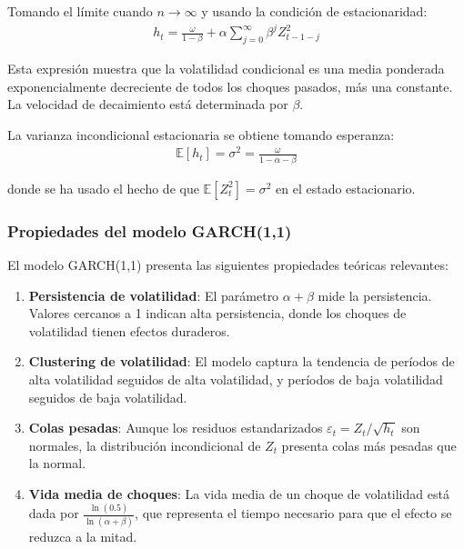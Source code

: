 Tomando el límite cuando $n \to \infty$ y usando la condición de estacionaridad:
\begin{align}
    h_t = \frac{\omega}{1-\beta} + \alpha \sum_{j=0}^{\infty} \beta^j Z_{t-1-j}^2
\end{align}

Esta expresión muestra que la volatilidad condicional es una media ponderada exponencialmente decreciente de todos los choques pasados, más una constante. La velocidad de decaimiento está determinada por $\beta$.

La varianza incondicional estacionaria se obtiene tomando esperanza:
\begin{align}
    \mathbb{E}[h_t] = \sigma^2 = \frac{\omega}{1 - \alpha - \beta}
\end{align}

donde se ha usado el hecho de que $\mathbb{E}[Z_t^2] = \sigma^2$ en el estado estacionario.

\subsubsection{Propiedades del modelo GARCH(1,1)}

El modelo GARCH(1,1) presenta las siguientes propiedades teóricas relevantes:

\begin{enumerate}
    \item \textbf{Persistencia de volatilidad}: El parámetro $\alpha + \beta$ mide la persistencia. Valores cercanos a 1 indican alta persistencia, donde los choques de volatilidad tienen efectos duraderos.
    
    \item \textbf{Clustering de volatilidad}: El modelo captura la tendencia de períodos de alta volatilidad seguidos de alta volatilidad, y períodos de baja volatilidad seguidos de baja volatilidad.
    
    \item \textbf{Colas pesadas}: Aunque los residuos estandarizados $\varepsilon_t = Z_t/\sqrt{h_t}$ son normales, la distribución incondicional de $Z_t$ presenta colas más pesadas que la normal.
    
    \item \textbf{Vida media de choques}: La vida media de un choque de volatilidad está dada por $\frac{\ln(0.5)}{\ln(\alpha + \beta)}$, que representa el tiempo necesario para que el efecto se reduzca a la mitad.
\end{enumerate}

